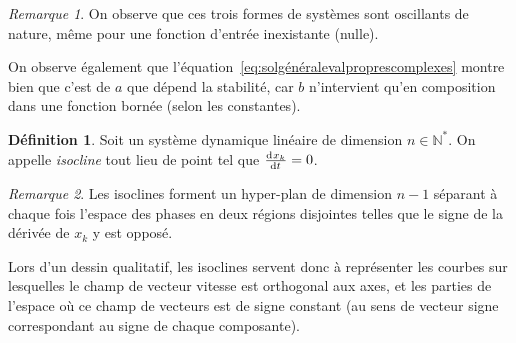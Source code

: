 \documentclass{article}
\theoremstyle{definition}
\newtheorem{déf}[thm]{Définition}
\theoremstyle{remark}
\newtheorem*{rmq}{Remarque}
\newcommand{\N}{\mathbb N}
\begin{document}
	\begin{rmq} On observe que ces trois formes de systèmes sont oscillants de nature, même pour une fonction d'entrée inexistante (nulle).

	On observe également que l'équation~\eqref{eq:solgénéralevalproprescomplexes} montre bien que c'est de $a$ que dépend la stabilité, car $b$ n'intervient
	qu'en composition dans une fonction bornée (selon les constantes).
	\end{rmq}

	\begin{déf} Soit un système dynamique linéaire de dimension $n \in \N^*$. On appelle \textit{isocline} tout lieu de point tel que $\od {x_k}t = 0$.
	\end{déf}

	\begin{rmq} Les isoclines forment un hyper-plan de dimension $n-1$ séparant à chaque fois l'espace des phases en deux régions disjointes telles que le signe
	de la dérivée de $x_k$ y est opposé.

	Lors d'un dessin qualitatif, les isoclines servent donc à représenter les courbes sur lesquelles le champ de vecteur vitesse est orthogonal aux axes, et
	les parties de l'espace où ce champ de vecteurs est de signe constant (au sens de vecteur signe correspondant au signe de chaque composante).
	\end{rmq}
\end{document}

